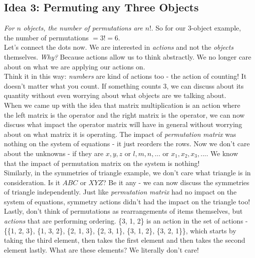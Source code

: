 \subsection{Idea 3: Permuting any Three Objects}

\textit{For $n$ objects, the number of permutations are $n!$}. So for our 3-object example, the number of permutations $= 3! = 6$. \\

Let's connect the dots now. We are interested in \textit{actions} and not the \textit{objects} themselves. \textit{Why?} Because actions allow us to think abstractly. We no longer care about on what we are applying our actions on. \\

Think it in this way: \textit{numbers} are kind of actions too - the action of counting! It doesn't matter what you count. If something counts 3, we can discuss about its quantity without even worrying about what objects are we talking about. \\

When we came up with the idea that matrix multiplication is an action where the left matrix is the operator and the right matrix is the operator, we can now discuss what impact the operator matrix will have in general without worrying about on what matrix it is operating. The impact of \textit{permutation matrix} was nothing on the system of equations - it just reorders the rows. Now we don't care about the unknowns - if they are $x, y, z$ or $l, m, n, ...$ or $x_1, x_2, x_3,...$. We know that the impact of permutation matrix on the system is nothing! \\

Similarly, in the symmetries of triangle example, we don't care what triangle is in consideration. Is it $ABC$ or $XYZ$? Be it any - we can now discuss the symmetries of triangle independently. Just like \textit{permutation matrix} had no impact on the system of equations, symmetry actions didn't had the impact on the triangle too! \\

Lastly, don't think of permutations as rearrangements of items themselves, but \textit{actions} that are performing ordering. \{3, 1, 2\} is an action in the set of actions - \{\{1, 2, 3\}, \{1, 3, 2\}, \{2, 1, 3\}, \{2, 3, 1\}, \{3, 1, 2\}, \{3, 2, 1\}\}, which starts by taking the third element, then takes the first element and then takes the second element lastly. What are these elements? We literally don't care! \\

